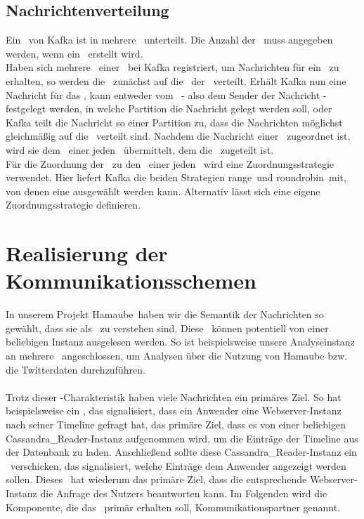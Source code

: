 \subsection{Nachrichtenverteilung}
Ein \T\ von Kafka ist in mehrere \Pts\ unterteilt. Die Anzahl der \Pts\ muss angegeben werden, wenn ein \T\ erstellt wird. \\
Haben sich mehrere \C\ einer \CG\ bei Kafka registriert, um Nachrichten für ein \T\ zu erhalten, so werden die \Pts\ zunächst auf die \C\ der \CG\ verteilt. Erhält Kafka nun eine Nachricht für das \T, kann entweder vom \Pd\ - also dem Sender der Nachricht - festgelegt werden, in welche Partition die Nachricht gelegt werden soll, oder Kafka teilt die Nachricht so einer Partition zu, dass die Nachrichten möglichst gleichmäßig auf die \Pts\ verteilt sind. Nachdem die Nachricht einer \Pt\ zugeordnet ist, wird sie dem \C\ einer jeden \CG\ übermittelt, dem die \Pt\ zugeteilt ist. \\
Für die Zuordnung der \Pts\ zu den \Cn\ einer jeden \CG\ wird eine Zuordnungsstrategie verwendet. Hier liefert Kafka die beiden Strategien \glqq range\grqq\ und \glqq roundrobin\grqq\ mit, von denen eine ausgewählt werden kann. Alternativ lässt sich eine eigene Zuordnungsstrategie definieren.
\section{Realisierung der Kommunikationsschemen}
In unserem Projekt \glqq Hamaube\grqq\ haben wir die Semantik der Nachrichten so gewählt, dass sie als \Evs\ zu verstehen sind. Diese \Evs\ können potentiell von einer beliebigen Instanz ausgelesen werden. So ist beispielsweise unsere Analyseinstanz an mehrere \Tcs\ angeschlossen, um Analysen über die Nutzung von Hamaube bzw. die Twitterdaten durchzuführen. \\
\\
Trotz dieser \Ev-Charakteristik haben viele Nachrichten ein primäres Ziel. So hat beispielsweise ein \Ev, das signalisiert, dass ein Anwender eine Webserver-Instanz nach seiner Timeline gefragt hat, das primäre Ziel, dass es von einer beliebigen Cassandra\_Reader-Instanz aufgenommen wird, um die Einträge der Timeline aus der Datenbank zu laden. Anschließend sollte diese Cassandra\_Reader-Instanz ein \Ev\ verschicken, das signalisiert, welche Einträge dem Anwender angezeigt werden sollen. Dieses \Ev\ hat wiederum das primäre Ziel, dass die entsprechende Webserver-Instanz die Anfrage des Nutzers beantworten kann. Im Folgenden wird die Komponente, die das \Ev\ primär erhalten soll, Kommunikationspartner genannt.
